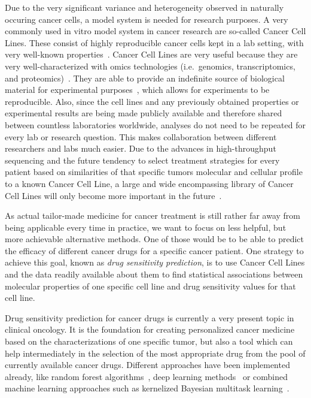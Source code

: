 Due to the very significant variance and heterogeneity observed in naturally occuring cancer cells, a model system is needed for research purposes. A very commonly used in vitro model system in cancer research are so-called Cancer Cell Lines. These consist of highly reproducible cancer cells kept in a lab setting, with very well-known properties~\cite{cancer_cell_line_definition}. Cancer Cell Lines are very useful because they are very well-characterized with omics technologies (i.e.\ genomics, transcriptomics, and proteomics)~\cite{cancer_cell_lines_useful_model}. They are able to provide an indefinite source of biological material for experimental purposes~\cite{cancer_cell_lines_useful_model}, which allows for experiments to be reproducible. Also, since the cell lines and any previously obtained properties or experimental results are being made publicly available and therefore shared between countless laboratories worldwide, analyses do not need to be repeated for every lab or research question. This makes collaboration between different researchers and labs much easier. Due to the advances in high-throughput sequencing and the future tendency to select treatment strategies for every patient based on similarities of that specific tumors molecular and cellular profile to a known Cancer Cell Line, a large and wide encompassing library of Cancer Cell Lines will only become more important in the future~\cite{cancer_cell_lines_useful_model}.

As actual tailor-made medicine for cancer treatment is still rather far away from being applicable every time in practice, we want to focus on less helpful, but more achievable alternative methods. One of those would be to be able to predict the efficacy of different cancer drugs for a specific cancer patient. One strategy to achieve this goal, known as \textit{drug sensitivity prediction}, is to use Cancer Cell Lines and the data readily available about them to find statistical associations between molecular properties of one specific cell line and drug sensitivity values for that cell line.%

Drug sensitivity prediction for cancer drugs is currently a very present topic in clinical oncology. It is the foundation for creating personalized cancer medicine based on the characterizations of one specific tumor, but also a tool which can help intermediately in the selection of the most appropriate drug from the pool of currently available cancer drugs. Different approaches have been implemented already, like random forest algorithms~\cite{predicting_drug_sensitivity_random_forests}, deep learning methods~\cite{predicting_drug_sensitivity_deep_learning} or combined machine learning approaches such as kernelized Bayesian multitask learning~\cite{predicting_drug_sensitivity_bayes}.%

